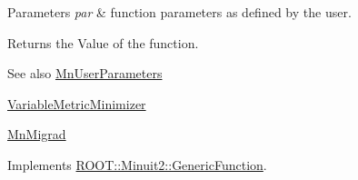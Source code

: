 \begin{DoxyParams}{Parameters}
{\em par} & function parameters as defined by the user.\\
\hline
\end{DoxyParams}
\begin{DoxyReturn}{Returns}
the Value of the function.
\end{DoxyReturn}
\begin{DoxySeeAlso}{See also}
\mbox{\hyperlink{classROOT_1_1Minuit2_1_1MnUserParameters}{Mn\+User\+Parameters}} 

\mbox{\hyperlink{classROOT_1_1Minuit2_1_1VariableMetricMinimizer}{Variable\+Metric\+Minimizer}} 

\mbox{\hyperlink{classROOT_1_1Minuit2_1_1MnMigrad}{Mn\+Migrad}} 
\end{DoxySeeAlso}


Implements \mbox{\hyperlink{classROOT_1_1Minuit2_1_1GenericFunction_a0d6039ad9aa18e475534d1fd80342e9d}{R\+O\+O\+T\+::\+Minuit2\+::\+Generic\+Function}}.



